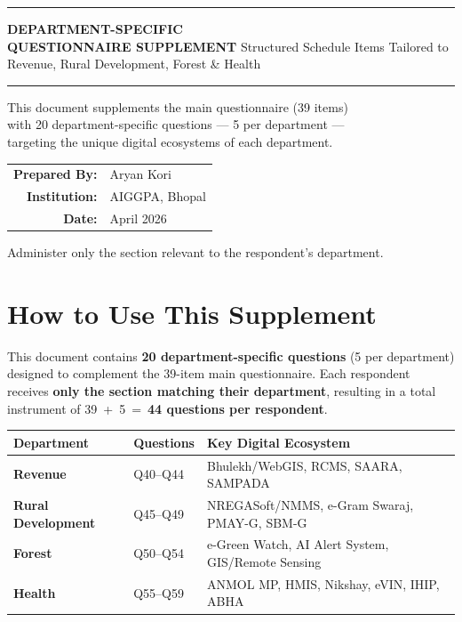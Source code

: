 \documentclass[11pt,a4paper]{article}
\begin{document}
\begin{titlepage}\centering
\vspace*{2.5cm}
{\color{gold}\rule{0.6\textwidth}{2pt}}\vspace{1cm}
{\Huge\bfseries\color{navy} DEPARTMENT-SPECIFIC\\[6pt] QUESTIONNAIRE SUPPLEMENT}\vspace{0.5cm}
{\Large\color{dk} Structured Schedule Items Tailored to\\[4pt] Revenue, Rural Development, Forest \& Health}\vspace{1cm}
{\color{gold}\rule{0.6\textwidth}{2pt}}\vspace{2cm}
{\large\color{mg} This document supplements the main questionnaire (39 items)\\[4pt] with 20 department-specific questions --- 5 per department ---\\[4pt] targeting the unique digital ecosystems of each department.}\vspace{2cm}
\begin{tabular}{r l}
\textbf{\color{navy}Prepared By:} & Aryan Kori \\[6pt]
\textbf{\color{navy}Institution:} & AIGGPA, Bhopal \\[6pt]
\textbf{\color{navy}Date:} & April 2026 \\
\end{tabular}
\vfill
{\small\color{mg} Administer only the section relevant to the respondent's department.}
\end{titlepage}
\tableofcontents\newpage

\section*{How to Use This Supplement}
This document contains \textbf{20 department-specific questions} (5 per department) designed to complement the 39-item main questionnaire. Each respondent receives \textbf{only the section matching their department}, resulting in a total instrument of 39~+~5~=~\textbf{44 questions per respondent}.

\begin{table}[H]\centering\small
\begin{tabularx}{\textwidth}{L{3.5cm} L{3cm} X}
\toprule
\textbf{Department} & \textbf{Questions} & \textbf{Key Digital Ecosystem} \\
\midrule
\textcolor{revcol}{\textbf{Revenue}} & Q40--Q44 & Bhulekh/WebGIS, RCMS, SAARA, SAMPADA \\[4pt]
\textcolor{rdcol}{\textbf{Rural Development}} & Q45--Q49 & NREGASoft/NMMS, e-Gram Swaraj, PMAY-G, SBM-G \\[4pt]
\textcolor{forcol}{\textbf{Forest}} & Q50--Q54 & e-Green Watch, AI Alert System, GIS/Remote Sensing \\[4pt]
\textcolor{hlcol}{\textbf{Health}} & Q55--Q59 & ANMOL MP, HMIS, Nikshay, eVIN, IHIP, ABHA \\
\bottomrule
\end{tabularx}
\end{table}
\newpage
\end{document}
